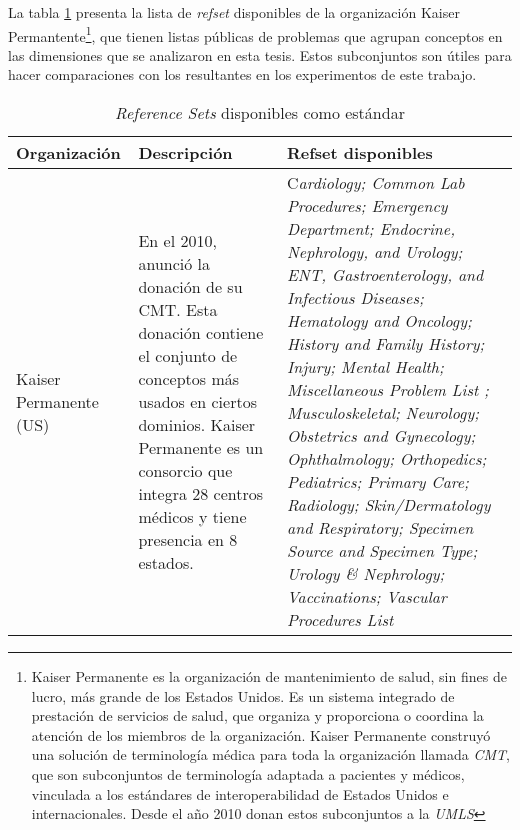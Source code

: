 La tabla \ref{refsetsSnomed} presenta la lista de \textit{\acrshort{refset}} disponibles de la organización Kaiser Permantente\footnote{Kaiser Permanente es la organización de mantenimiento de salud, sin fines de lucro, más grande de los Estados Unidos. Es un sistema integrado de prestación de servicios de salud, que organiza y proporciona o coordina la atención de los miembros de la organización. Kaiser Permanente construyó una solución de terminología médica para toda la organización llamada \textit{\acrfull{CMT}}, que son subconjuntos de terminología adaptada a pacientes y médicos, vinculada a los estándares de interoperabilidad de Estados Unidos e internacionales. Desde el año 2010 donan estos subconjuntos a la \textit{\acrfull{UMLS}}
}, que tienen listas públicas de problemas que agrupan conceptos en las dimensiones que se analizaron en esta tesis. Estos subconjuntos son útiles para hacer comparaciones con los resultantes en los experimentos de este trabajo.

\begin{table}[htb]
\caption{\textit{Reference Sets} disponibles como estándar}
\label{refsetsSnomed}
\begin{tabularx}{\textwidth}{@{}XXX@{}}
\toprule
Organización & Descripción & Refset disponibles \\ \midrule
Kaiser Permanente (US) & En el 2010, anunció la donación de su \acrshort{CMT}. Esta donación contiene el conjunto de conceptos más usados en ciertos dominios. Kaiser Permanente es un consorcio que integra 28 centros médicos y tiene presencia en 8 estados. & C\textit{ardiology; Common Lab Procedures; Emergency Department; Endocrine,  Nephrology, and Urology; ENT, Gastroenterology, and Infectious Diseases; Hematology and Oncology; History and Family History; Injury; Mental Health; Miscellaneous Problem List ; Musculoskeletal; Neurology; Obstetrics and Gynecology; Ophthalmology; Orthopedics; Pediatrics; Primary Care; Radiology; Skin/Dermatology and Respiratory; Specimen Source and Specimen Type; Urology \& Nephrology; Vaccinations; Vascular Procedures List} \\
\bottomrule
\end{tabularx}
\end{table}

